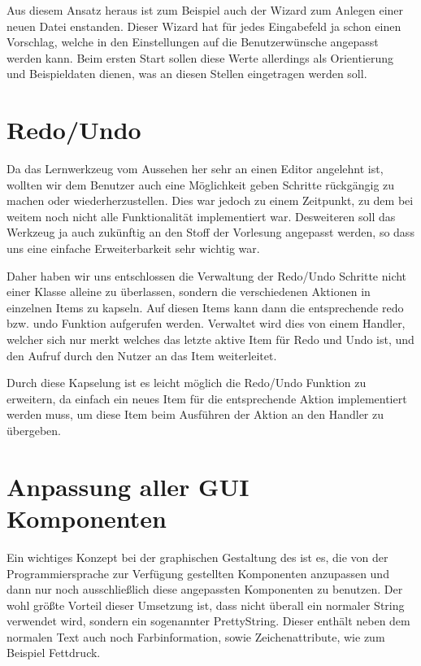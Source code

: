 Aus diesem Ansatz heraus ist zum Beispiel auch der Wizard zum Anlegen einer
neuen Datei enstanden. Dieser Wizard hat für jedes Eingabefeld ja schon einen
Vorschlag, welche in den Einstellungen auf die Benutzerwünsche angepasst werden
kann. Beim ersten Start sollen diese Werte allerdings als Orientierung und
Beispieldaten dienen, was an diesen Stellen eingetragen werden soll.
\vspace{10pt}


\section{Redo/Undo}

Da das Lernwerkzeug vom Aussehen her sehr an einen Editor angelehnt ist,
wollten wir dem Benutzer auch eine Möglichkeit geben Schritte rückgängig zu
machen oder wiederherzustellen. Dies war jedoch zu einem Zeitpunkt, zu dem bei
weitem noch nicht alle Funktionalität implementiert war. Desweiteren soll das
Werkzeug ja auch zukünftig an den Stoff der Vorlesung angepasst werden, so dass
uns eine einfache Erweiterbarkeit sehr wichtig war.\vspace{10pt}

Daher haben wir uns entschlossen die Verwaltung der Redo/Undo Schritte nicht
einer Klasse alleine zu überlassen, sondern die verschiedenen Aktionen in
einzelnen Items zu kapseln. Auf diesen Items kann dann die entsprechende redo
bzw. undo Funktion aufgerufen werden. Verwaltet wird dies von einem Handler,
welcher sich nur merkt welches das letzte aktive Item für Redo und Undo ist,
und den Aufruf durch den Nutzer an das Item weiterleitet.\vspace{10pt}

Durch diese Kapselung ist es leicht möglich die Redo/Undo Funktion zu
erweitern, da einfach ein neues Item für die entsprechende Aktion implementiert
werden muss, um diese Item beim Ausführen der Aktion an den Handler zu
übergeben.\vspace{10pt}


\section{Anpassung aller GUI Komponenten}

Ein wichtiges Konzept bei der graphischen Gestaltung des \gtitool ist es, die von
der Programmiersprache zur Verfügung gestellten Komponenten anzupassen und dann
nur noch ausschließlich diese angepassten Komponenten zu benutzen. Der wohl
größte Vorteil dieser Umsetzung ist, dass nicht überall ein normaler String
verwendet wird, sondern ein sogenannter PrettyString. Dieser enthält neben dem
normalen Text auch noch Farbinformation, sowie Zeichenattribute, wie zum
Beispiel Fettdruck.\vspace{10pt}

